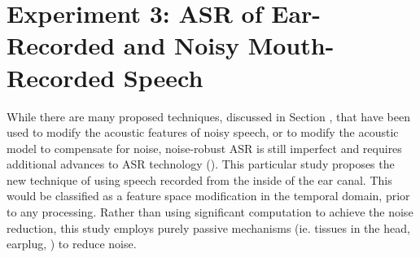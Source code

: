 % 
% 
% 
% 
% 





\DIFdelbegin %
\DIFdelend \DIFaddbegin \section{Experiment 3: ASR of Ear-Recorded and Noisy Mouth-Recorded Speech}\label{expt3}
\DIFaddend 

While there are many proposed techniques, discussed in Section \DIFdelbegin \DIFdel{\ref{chap3:background}}\DIFdelend \DIFaddbegin \DIFadd{\ref{chap4:background}}\DIFaddend , that have been used to modify the acoustic features of noisy speech, or to modify the acoustic model to compensate for noise, noise-robust ASR is still imperfect and requires additional advances to ASR technology (\cite{zhang:17}).  This particular study proposes the new technique of using speech recorded from the inside of the ear canal.  This would be classified as a feature space modification in the temporal domain, prior to any processing.  Rather than using significant computation to achieve the noise reduction, this study employs purely passive mechanisms (ie. tissues in the head, earplug, \DIFdelbegin {}\DIFdelend \DIFaddbegin {}\DIFaddend ) to reduce noise.  

